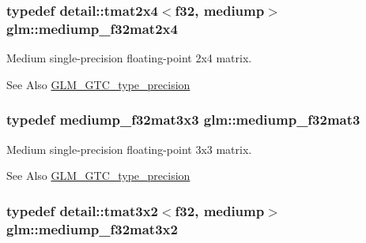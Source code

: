 \hypertarget{group__gtc__type__precision_ga20c5b3b715b70f1c09f7f95bfaa7aa84}{
\subsubsection[{mediump\-\_\-f32mat2x4}]{\setlength{\rightskip}{0pt plus 5cm}typedef detail\-::tmat2x4$<$f32, mediump$>$ {\bf glm\-::mediump\-\_\-f32mat2x4}}}\label{group__gtc__type__precision_ga20c5b3b715b70f1c09f7f95bfaa7aa84}
Medium single-\/precision floating-\/point 2x4 matrix. \begin{DoxySeeAlso}{See Also}
\hyperlink{group__gtc__type__precision}{G\-L\-M\-\_\-\-G\-T\-C\-\_\-type\-\_\-precision} 
\end{DoxySeeAlso}
\hypertarget{group__gtc__type__precision_gae263a08ef179894fdd36f9a51698c4ab}{
\subsubsection[{mediump\-\_\-f32mat3}]{\setlength{\rightskip}{0pt plus 5cm}typedef mediump\-\_\-f32mat3x3 {\bf glm\-::mediump\-\_\-f32mat3}}}\label{group__gtc__type__precision_gae263a08ef179894fdd36f9a51698c4ab}
Medium single-\/precision floating-\/point 3x3 matrix. \begin{DoxySeeAlso}{See Also}
\hyperlink{group__gtc__type__precision}{G\-L\-M\-\_\-\-G\-T\-C\-\_\-type\-\_\-precision} 
\end{DoxySeeAlso}
\hypertarget{group__gtc__type__precision_ga9762d48bb9b41e3cf40f6e616cf61b6b}{
\subsubsection[{mediump\-\_\-f32mat3x2}]{\setlength{\rightskip}{0pt plus 5cm}typedef detail\-::tmat3x2$<$f32, mediump$>$ {\bf glm\-::mediump\-\_\-f32mat3x2}}}\label{group__gtc__type__precision_ga9762d48bb9b41e3cf40f6e616cf61b6b}
